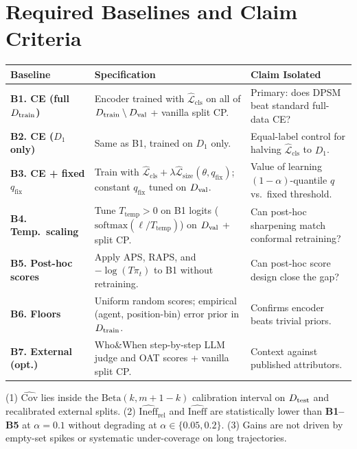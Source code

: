 \documentclass[10pt,a4paper]{article}
\newcommand{\Lcls}{\widehat{\mathcal L}_{\mathrm{cls}}}
\newcommand{\Lsize}{\widehat{\mathcal L}_{\mathrm{size}}}
\begin{document}
\newpage


\section{Required Baselines and Claim Criteria} \label{sec:baselines}

\smallskip
{\small\renewcommand{\arraystretch}{1.04}%
\noindent\begin{tabularx}{\linewidth}{@{}>{\raggedright\arraybackslash}p{3.1cm} L L@{}}\toprule
\sffamily\bfseries Baseline & \sffamily\bfseries Specification & \sffamily\bfseries Claim Isolated \\\midrule
\textbf{B1. CE (full $D_{\mathrm{train}}$)} & Encoder trained with $\Lcls$ on all of $D_{\mathrm{train}}\setminus D_{\mathrm{val}}$ + vanilla split CP. & Primary: does DPSM beat standard full-data CE? \\
\textbf{B2. CE ($D_1$ only)} & Same as B1, trained on $D_1$ only. & Equal-label control for halving $\Lcls$ to $D_1$. \\
\textbf{B3. CE + fixed $q_{\mathrm{fix}}$} & Train with $\Lcls+\lambda\Lsize(\theta,q_{\mathrm{fix}})$; constant $q_{\mathrm{fix}}$ tuned on $D_{\mathrm{val}}$. & Value of learning $(1-\alpha)$-quantile $q$ vs.\ fixed threshold. \\
\textbf{B4. Temp.\ scaling} & Tune $T_{\mathrm{temp}}>0$ on B1 logits ($\mathrm{softmax}(\ell/T_{\mathrm{temp}})$) on $D_{\mathrm{val}}$ + split CP. & Can post-hoc sharpening match conformal retraining? \\
\textbf{B5. Post-hoc scores} & Apply APS, RAPS, and $-\log(T\pi_t)$ to B1 without retraining. & Can post-hoc score design close the gap? \\
\textbf{B6. Floors} & Uniform random scores; empirical (agent, position-bin) error prior in $D_{\mathrm{train}}$. & Confirms encoder beats trivial priors. \\
\textbf{B7. External (opt.)} & Who\&When step-by-step LLM judge and OAT scores + vanilla split CP. & Context against published attributors. \\\bottomrule
\end{tabularx}}
\medskip

\begin{tcolorbox}[critbox,title={Claim Criteria (When WP1 Supports RQ1)}]
\small
(1) $\widehat{\mathrm{Cov}}$ lies inside the $\mathrm{Beta}(k,m+1-k)$ calibration interval on $D_{\mathrm{test}}$ and recalibrated external splits.
(2) $\widehat{\mathrm{Ineff}}_{\mathrm{rel}}$ and $\widehat{\mathrm{Ineff}}$ are statistically lower than \textbf{B1--B5} at $\alpha=0.1$ without degrading at $\alpha\in\{0.05,0.2\}$.
(3) Gains are not driven by empty-set spikes or systematic under-coverage on long trajectories.
\end{tcolorbox}
\end{document}
